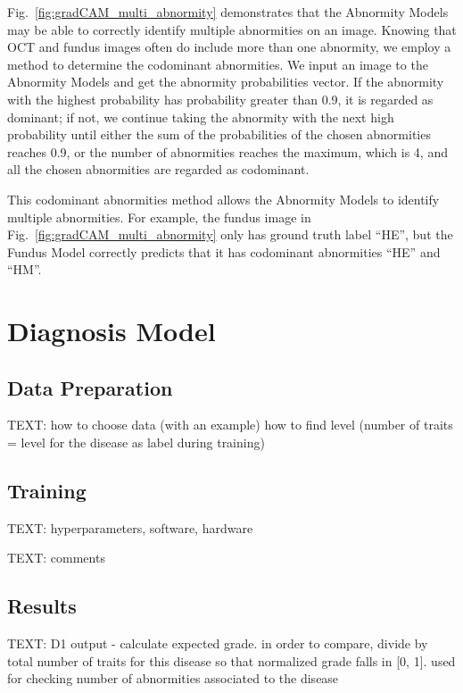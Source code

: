 \documentclass{article}
\begin{document}
	Fig.~\ref{fig:gradCAM_multi_abnormity} demonstrates that the Abnormity Models may be able to correctly identify multiple abnormities on an image. Knowing that OCT and fundus images often do include more than one abnormity, we employ a method to determine the codominant abnormities. We input an image to the Abnormity Models and get the abnormity probabilities vector. If the abnormity with the highest probability has probability greater than 0.9, it is regarded as dominant; if not, we continue taking the abnormity with the next high probability until either the sum of the probabilities of the chosen abnormities reaches 0.9, or the number of abnormities reaches the maximum, which is 4, and all the chosen abnormities are regarded as codominant. 
	
	This codominant abnormities method allows the Abnormity Models to identify multiple abnormities. For example, the fundus image in Fig.~\ref{fig:gradCAM_multi_abnormity} only has ground truth label ``HE'', but the Fundus Model correctly predicts that it has codominant abnormities ``HE'' and ``HM''. 
	
	\section{Diagnosis Model}
	
	\subsection{Data Preparation}
	
	TEXT: how to choose data (with an example)
	how to find level (number of traits = level for the disease as label during training)
	
	
	\subsection{Training}
	
	TEXT: hyperparameters, software, hardware
	
	TEXT: comments
	
	
	\subsection{Results}
	
	TEXT: D1 output - calculate expected grade. in order to compare, divide by total number of traits for this disease so that normalized grade falls in [0, 1]. 
	used for checking number of abnormities associated to the disease
	
\end{document}
